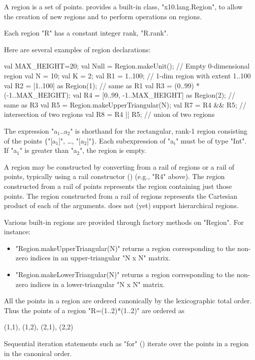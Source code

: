 A region is a set of points.  {}\Xten{}
provides a built-in class, \xcd"x10.lang.Region", to allow the
creation of new regions and to perform operations on regions. 

Each region \xcd"R" has a constant integer rank, \xcd"R.rank".

Here are several examples of region declarations:
\begin{xten}
val MAX_HEIGHT=20;
val Null = Region.makeUnit();  // Empty 0-dimensional region          
val N = 10;
val K = 2;
val R1 = 1..100; // 1-dim region with extent 1..100
val R2 = [1..100] as Region(1); // same as R1
val R3 = (0..99) * (-1..MAX_HEIGHT);   
val R4 = [0..99, -1..MAX_HEIGHT] as Region(2); // same as R3  
val R5 = Region.makeUpperTriangular(N);
val R7 = R4 && R5; // intersection of two regions
val R8 = R4 || R5; // union of two regions
\end{xten}

The expression \xcdmath"a$_1$..a$_2$"
is shorthand for the rectangular, rank-1 region
consisting of the points
$\{$\xcdmath"[a$_1$]", \dots, \xcdmath"[a$_2$]"$\}$.
Each subexpression of \xcdmath"a$_i$" must be of type \xcd"Int".
If \xcdmath"a$_1$"
is greater than \xcdmath"a$_2$", the region is empty.

A region may be constructed by converting from a rail of
regions or a rail of points, typically using a rail constructor
()
(e.g., \xcd"R4" above).
The region constructed from a rail of points represents the
region containing just those points.
The region constructed from a rail of regions
represents
the Cartesian product of each of the arguments.
\XtenCurrVer{} does not (yet) support hierarchical regions.


Various built-in regions are provided through  factory
methods on \xcd"Region".  For instance:
\begin{itemize}
\item \xcd"Region.makeUpperTriangular(N)" returns a region corresponding
to the non-zero indices in an upper-triangular \xcd"N x N" matrix.
\item \xcd"Region.makeLowerTriangular(N)" returns a region corresponding
to the non-zero indices in a lower-triangular \xcd"N x N" matrix.
\end{itemize}

All the points in a region are ordered canonically by the
lexicographic total order. Thus the points of a region \xcd"R=(1..2)*(1..2)"
are ordered as 
\begin{xten}
(1,1), (1,2), (2,1), (2,2)
\end{xten}
Sequential iteration statements such as \xcd"for" ()
iterate over the points in a region in the canonical order.

